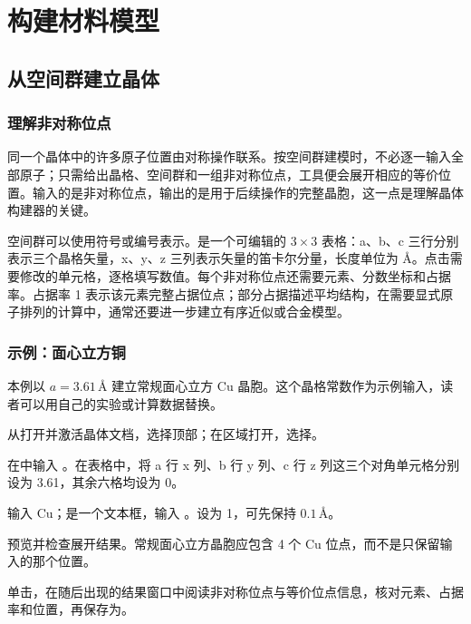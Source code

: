 \chapter{构建材料模型}\label{ch:advanced}


\section{从空间群建立晶体}

\subsection{理解非对称位点}

同一个晶体中的许多原子位置由对称操作联系。按空间群建模时，不必逐一输入全部原子；只需给出晶格、空间群和一组非对称位点，工具便会展开相应的等价位置。输入的是非对称位点，输出的是用于后续操作的完整晶胞，这一点是理解晶体构建器的关键。

空间群可以使用符号或编号表示。是一个可编辑的 $3\times3$ 表格：a、b、c 三行分别表示三个晶格矢量，x、y、z 三列表示矢量的笛卡尔分量，长度单位为 \AA。点击需要修改的单元格，逐格填写数值。每个非对称位点还需要元素、分数坐标和占据率。占据率 1 表示该元素完整占据位点；部分占据描述平均结构，在需要显式原子排列的计算中，通常还要进一步建立有序近似或合金模型。

\subsection{示例：面心立方铜}

本例以 $a=3.61\,\text{\AA}$ 建立常规面心立方 Cu 晶胞。这个晶格常数作为示例输入，读者可以用自己的实验或计算数据替换。

\begin{steps}
  \item 从打开并激活晶体文档，选择顶部；在区域打开，选择。
  \item 在中输入 。在表格中，将 a 行 x 列、b 行 y 列、c 行 z 列这三个对角单元格分别设为 3.61，其余六格均设为 0。
  \item {}输入 Cu；是一个文本框，输入 。设为 1，可先保持 $0.1\,\text{\AA}$。
  \item 预览并检查展开结果。常规面心立方晶胞应包含 4 个 Cu 位点，而不是只保留输入的那个位置。
  \item 单击，在随后出现的结果窗口中阅读非对称位点与等价位点信息，核对元素、占据率和位置，再保存为。
\end{steps}

